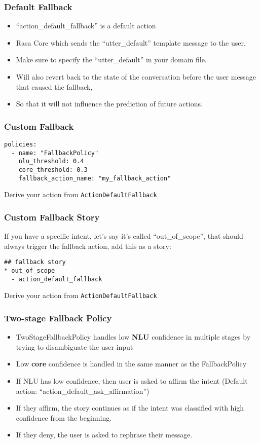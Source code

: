  \begin{frame}[fragile]\frametitle{Default Fallback}
\begin{itemize}
\item ``action\_default\_fallback'' is a default action
\item Rasa Core which sends the ``utter\_default'' template message to the user. 
\item Make sure to specify the ``utter\_default'' in your domain file. 
\item Will also revert back to the state of the conversation before the user message that caused the fallback, 
\item So that it will not influence the prediction of future actions. 
\end{itemize}
\end{frame}

 \begin{frame}[fragile]\frametitle{Custom Fallback}
\begin{lstlisting}
policies:
  - name: "FallbackPolicy"
    nlu_threshold: 0.4
    core_threshold: 0.3
    fallback_action_name: "my_fallback_action"
\end{lstlisting}

Derive your action from \lstinline|ActionDefaultFallback|
\end{frame}

 \begin{frame}[fragile]\frametitle{Custom Fallback Story}
 If you have a specific intent, let's say it's called ``out\_of\_scope'', that should always trigger the fallback action, add this as a story:
\begin{lstlisting}
## fallback story
* out_of_scope
  - action_default_fallback
\end{lstlisting}

Derive your action from \lstinline|ActionDefaultFallback|
\end{frame}

 \begin{frame}[fragile]\frametitle{Two-stage Fallback Policy}
\begin{itemize}
\item TwoStageFallbackPolicy handles low {\bf NLU} confidence in multiple stages by trying to disambiguate the user input 
\item Low {\bf core} confidence is handled in the same manner as the FallbackPolicy
\item If NLU has low confidence, then user is asked to affirm the intent (Default action: ``action\_default\_ask\_affirmation'')
\item If they affirm, the story continues as if the intent was classified with high confidence from the beginning.
\item If they deny, the user is asked to rephrase their message.
\end{itemize}
\end{frame}

